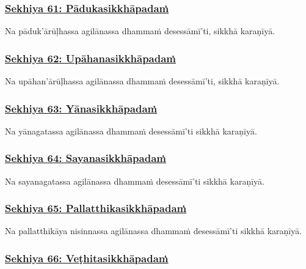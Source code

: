 \subsubsection*{\hyperref[training61]{Sekhiya 61: Pādukasikkhāpadaṁ}}
\label{sekh61}

Na pāduk'ārūḷhassa agilānassa dhammaṁ desessāmī'ti, sikkhā karaṇīyā.



\subsubsection*{\hyperref[training62]{Sekhiya 62: Upāhanasikkhāpadaṁ}}
\label{sekh62}

Na upāhan'ārūḷhassa agilānassa dhammaṁ desessāmī'ti, sikkhā karaṇīyā.



\subsubsection*{\hyperref[training63]{Sekhiya 63: Yānasikkhāpadaṁ}}
\label{sekh63}

Na yānagatassa agilānassa dhammaṁ desessāmī'ti sikkhā karaṇīyā.



\subsubsection*{\hyperref[training64]{Sekhiya 64: Sayanasikkhāpadaṁ}}
\label{sekh64}

Na sayanagatassa agilānassa dhammaṁ desessāmī'ti sikkhā karaṇīyā.



\subsubsection*{\hyperref[training65]{Sekhiya 65: Pallatthikasikkhāpadaṁ}}
\label{sekh65}

Na pallatthikāya nisinnassa agilānassa dhammaṁ desessāmī'ti sikkhā karaṇīyā.



\subsubsection*{\hyperref[training66]{Sekhiya 66: Veṭhitasikkhāpadaṁ}}
\label{sekh66}

